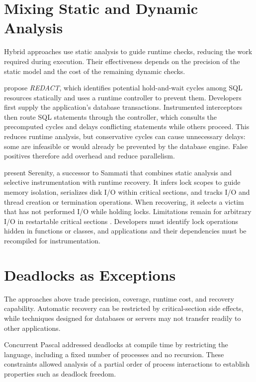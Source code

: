 \section{Mixing Static and Dynamic Analysis}

Hybrid approaches use static analysis to guide runtime checks, reducing the work required during execution.
Their effectiveness depends on the precision of the static model and the cost of the remaining dynamic checks.

\citet{grechanik} propose \emph{REDACT}, which identifies potential hold-and-wait cycles among SQL resources statically and uses a runtime controller to prevent them.
Developers first supply the application's database transactions. Instrumented interceptors then route SQL statements through the controller, which consults the precomputed cycles and delays conflicting statements while others proceed.
This reduces runtime analysis, but conservative cycles can cause unnecessary delays: some are infeasible or would already be prevented by the database engine.
False positives therefore add overhead and reduce parallelism.

\citet{serenity} present Serenity, a successor to Sammati \citep{sammati} that combines static analysis and selective instrumentation with runtime recovery.
It infers lock scopes to guide memory isolation, serializes disk I/O within critical sections, and tracks I/O and thread creation or termination operations.
When recovering, it selects a victim that has not performed I/O while holding locks.
Limitations remain for arbitrary I/O in restartable critical sections \citep{pyla}. Developers must identify lock operations hidden in functions or classes, and applications and their dependencies must be recompiled for instrumentation.

\section{Deadlocks as Exceptions}

The approaches above trade precision, coverage, runtime cost, and recovery capability. Automatic recovery can be restricted by critical-section side effects, while techniques designed for databases or servers may not transfer readily to other applications.

Concurrent Pascal \citep{hansen} addressed deadlocks at compile time by restricting the language, including a fixed number of processes and no recursion.
These constraints allowed analysis of a partial order of process interactions to establish properties such as deadlock freedom.

